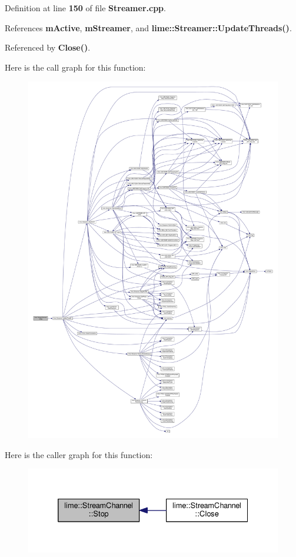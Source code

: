 Definition at line {\bf 150} of file {\bf Streamer.\+cpp}.



References {\bf m\+Active}, {\bf m\+Streamer}, and {\bf lime\+::\+Streamer\+::\+Update\+Threads()}.



Referenced by {\bf Close()}.



Here is the call graph for this function\+:
\nopagebreak
\begin{figure}[H]
\begin{center}
\leavevmode
\includegraphics[width=350pt]{d7/db1/classlime_1_1StreamChannel_a05331d809d6ba661d28a9d8954715acc_cgraph}
\end{center}
\end{figure}




Here is the caller graph for this function\+:
\nopagebreak
\begin{figure}[H]
\begin{center}
\leavevmode
\includegraphics[width=332pt]{d7/db1/classlime_1_1StreamChannel_a05331d809d6ba661d28a9d8954715acc_icgraph}
\end{center}
\end{figure}



